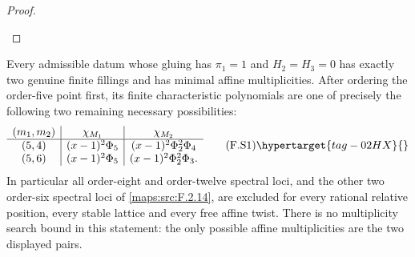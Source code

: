 \begin{proof}
\begin{enumerate}[label={$\langle1\rangle$\arabic*.}]
\end{enumerate}
\end{proof}




\begin{theorem}\hypertarget{tag-02NF}{}\label{maps:src:F.2.25}


Every admissible datum whose gluing has $\pi_1=1$ and $H_2=H_3=0$ has
exactly two genuine finite fillings and has minimal affine
multiplicities.  After ordering the order-five point first,
its finite characteristic polynomials are one of precisely
the following two remaining necessary possibilities:
\[
\begin{array}{c|c|c}
 (m_1,m_2)&\chi_{M_1}&\chi_{M_2}\\\hline
 (5,4)&(x-1)^2\Phi_5&(x-1)^2\Phi_2^2\Phi_4\\
 (5,6)&(x-1)^2\Phi_5&(x-1)^2\Phi_2^2\Phi_3.
\end{array}
 \tag{F.S1}\hypertarget{tag-02HX}{}\label{maps:eq:F.S1}
\]
In particular all order-eight and order-twelve spectral
loci, and the other two order-six spectral loci of \ref{maps:src:F.2.14},
are excluded for every rational relative position, every
stable lattice and every free affine twist.
There is no multiplicity search bound in this statement:
the only possible affine multiplicities are the
two displayed pairs.

\end{theorem}


